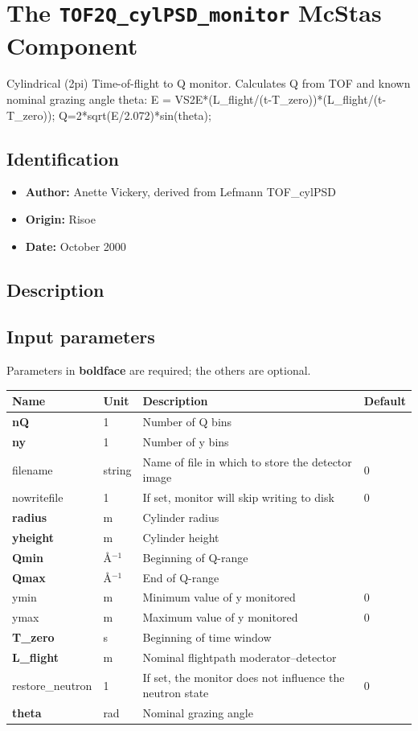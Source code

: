 \section{The \texttt{TOF2Q\_cylPSD\_monitor} McStas Component}
Cylindrical (2pi) Time-of-flight to Q monitor.
Calculates Q from TOF and known nominal grazing angle theta:
E = VS2E*(L\_flight/(t-T\_zero))*(L\_flight/(t-T\_zero));
Q=2*sqrt(E/2.072)*sin(theta);

\subsection*{Identification}
\begin{itemize}
  \item \textbf{Author:} Anette Vickery, derived from Lefmann TOF\_cylPSD
  \item \textbf{Origin:} Risoe
  \item \textbf{Date:} October 2000
\end{itemize}

\subsection*{Description}


\subsection*{Input parameters}
Parameters in \textbf{boldface} are required; the others are optional.

\begin{longtable}{p{}p{}p{}p{}}
\toprule
\textbf{Name} & \textbf{Unit} & \textbf{Description} & \textbf{Default} \\
\midrule
\endhead
\textbf{nQ} & 1 & Number of Q bins &  \\
\textbf{ny} & 1 & Number of y bins &  \\
filename & string & Name of file in which to store the detector image & 0 \\
nowritefile & 1 & If set, monitor will skip writing to disk & 0 \\
\textbf{radius} & m & Cylinder radius &  \\
\textbf{yheight} & m & Cylinder height &  \\
\textbf{Qmin} & \AA{}$^{-1}$ & Beginning of Q-range &  \\
\textbf{Qmax} & \AA{}$^{-1}$ & End of Q-range &  \\
ymin & m & Minimum value of y monitored & 0 \\
ymax & m & Maximum value of y monitored & 0 \\
\textbf{T\_zero} & s & Beginning of time window &  \\
\textbf{L\_flight} & m & Nominal flightpath moderator--detector &  \\
restore\_neutron & 1 & If set, the monitor does not influence the neutron state & 0 \\
\textbf{theta} & rad & Nominal grazing angle &  \\
\bottomrule
\end{longtable}

